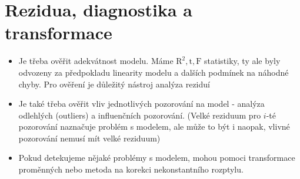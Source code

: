 \section{Rezidua, diagnostika a transformace}
\begin{itemize}
 \item Je třeba ověřit adekvátnost modelu. Máme $ \text{R}^{2} , \text{t}, \text{F} $ statistiky, ty ale byly odvozeny za předpokladu linearity modelu a dalších podmínek na náhodné chyby. Pro ověření je důležitý nástroj analýza reziduí
 \item Je také třeba ověřit vliv jednotlivých pozorování na model - analýza odlehlých (outliers) a influenčních pozorování. (Velké reziduum pro $ i $-té pozorování naznačuje problém s modelem, ale může to být i naopak, vlivné pozorování nemusí mít velké reziduum)
 \item Pokud detekujeme nějaké problémy s modelem, mohou pomoci transformace proměnných nebo metoda na korekci nekonstantního rozptylu.
\end{itemize}
